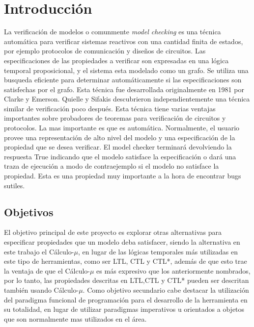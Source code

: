 \chapter{Introducción}

La verificación de modelos o comunmente \emph{model checking} es una técnica automática para verificar sistemas reactivos con una cantidad finita de estados, por ejemplo protocolos de comunicación y diseños de circuitos. Las especificaciones de las propiedades a verificar son expresadas en una lógica temporal proposicional, y el sistema esta modelado como un grafo. Se utiliza una busqueda eficiente para determinar automáticamente si las especificaciones son satisfechas por el grafo. Esta técnica fue desarrollada originalmente en 1981 por Clarke y Emerson. Quielle y Sifakis descubrieron independientemente una técnica similar de verificación poco después.
Esta técnica tiene varias ventajas importantes sobre probadores de teoremas para verificación de circuitos y protocolos. La mas importante es que es automática. Normalmente, el usuario provee una representación de alto nivel del modelo y una especificación de la propiedad que se desea verificar. El model checker terminará devolviendo la respuesta True indicando que el modelo satisface la especificación o dará una traza de ejecución a modo de contraejemplo si el modelo no satisface la propiedad. Esta es una propiedad muy importante a la hora de encontrar bugs sutiles.

\section{Objetivos}
El objetivo principal de este proyecto es explorar otras alternativas para especificar propiedades que un modelo deba satisfacer, siendo la alternativa en este trabajo el Cálculo-$\mu$, en lugar de las lógicas temporales más utilizadas en este tipo de herramientas, como ser LTL, CTL y CTL*, además de que esto trae la ventaja de que el Cálculo-$\mu$ es más expresivo que los anteriormente nombrados, por lo tanto, las propiedades descritas en LTL,CTL y CTL* pueden ser descritan también usando Cálculo-$\mu$.
Como objetivo secundario cabe destacar la utilización del paradigma funcional de programación para el desarrollo de la herramienta en su totalidad, en lugar de utilizar paradigmas imperativos u orientados a objetos que son normalmente mas utilizados en el área.

